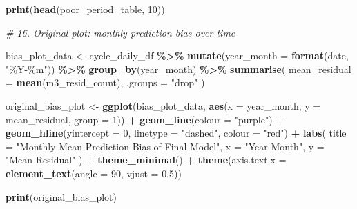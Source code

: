 \documentclass[
]{article}
\newenvironment{Shaded}{\begin{snugshade}}{\end{snugshade}}
\newcommand{\AttributeTok}[1]{\textcolor[rgb]{0.13,0.29,0.53}{#1}}
\newcommand{\CommentTok}[1]{\textcolor[rgb]{0.56,0.35,0.01}{\textit{#1}}}
\newcommand{\DecValTok}[1]{\textcolor[rgb]{0.00,0.00,0.81}{#1}}
\newcommand{\FloatTok}[1]{\textcolor[rgb]{0.00,0.00,0.81}{#1}}
\newcommand{\FunctionTok}[1]{\textcolor[rgb]{0.13,0.29,0.53}{\textbf{#1}}}
\newcommand{\NormalTok}[1]{#1}
\newcommand{\OtherTok}[1]{\textcolor[rgb]{0.56,0.35,0.01}{#1}}
\newcommand{\SpecialCharTok}[1]{\textcolor[rgb]{0.81,0.36,0.00}{\textbf{#1}}}
\newcommand{\StringTok}[1]{\textcolor[rgb]{0.31,0.60,0.02}{#1}}
\begin{document}
\begin{Shaded}
\begin{Highlighting}[]
\FunctionTok{print}\NormalTok{(}\FunctionTok{head}\NormalTok{(poor\_period\_table, }\DecValTok{10}\NormalTok{))}

\CommentTok{\# 16. Original plot: monthly prediction bias over time}

\NormalTok{bias\_plot\_data }\OtherTok{\textless{}{-}}\NormalTok{ cycle\_daily\_df }\SpecialCharTok{\%\textgreater{}\%}
  \FunctionTok{mutate}\NormalTok{(}\AttributeTok{year\_month =} \FunctionTok{format}\NormalTok{(date, }\StringTok{"\%Y{-}\%m"}\NormalTok{)) }\SpecialCharTok{\%\textgreater{}\%}
  \FunctionTok{group\_by}\NormalTok{(year\_month) }\SpecialCharTok{\%\textgreater{}\%}
  \FunctionTok{summarise}\NormalTok{(}
    \AttributeTok{mean\_residual =} \FunctionTok{mean}\NormalTok{(m3\_resid\_count),}
    \AttributeTok{.groups =} \StringTok{"drop"}
\NormalTok{  )}

\NormalTok{original\_bias\_plot }\OtherTok{\textless{}{-}} \FunctionTok{ggplot}\NormalTok{(bias\_plot\_data, }\FunctionTok{aes}\NormalTok{(}\AttributeTok{x =}\NormalTok{ year\_month, }\AttributeTok{y =}\NormalTok{ mean\_residual, }\AttributeTok{group =} \DecValTok{1}\NormalTok{)) }\SpecialCharTok{+}
  \FunctionTok{geom\_line}\NormalTok{(}\AttributeTok{colour =} \StringTok{"purple"}\NormalTok{) }\SpecialCharTok{+}
  \FunctionTok{geom\_hline}\NormalTok{(}\AttributeTok{yintercept =} \DecValTok{0}\NormalTok{, }\AttributeTok{linetype =} \StringTok{"dashed"}\NormalTok{, }\AttributeTok{colour =} \StringTok{"red"}\NormalTok{) }\SpecialCharTok{+}
  \FunctionTok{labs}\NormalTok{(}
    \AttributeTok{title =} \StringTok{"Monthly Mean Prediction Bias of Final Model"}\NormalTok{,}
    \AttributeTok{x =} \StringTok{"Year{-}Month"}\NormalTok{,}
    \AttributeTok{y =} \StringTok{"Mean Residual"}
\NormalTok{  ) }\SpecialCharTok{+}
  \FunctionTok{theme\_minimal}\NormalTok{() }\SpecialCharTok{+}
  \FunctionTok{theme}\NormalTok{(}\AttributeTok{axis.text.x =} \FunctionTok{element\_text}\NormalTok{(}\AttributeTok{angle =} \DecValTok{90}\NormalTok{, }\AttributeTok{vjust =} \FloatTok{0.5}\NormalTok{))}

\FunctionTok{print}\NormalTok{(original\_bias\_plot)}
\end{Highlighting}
\end{Shaded}
\end{document}
